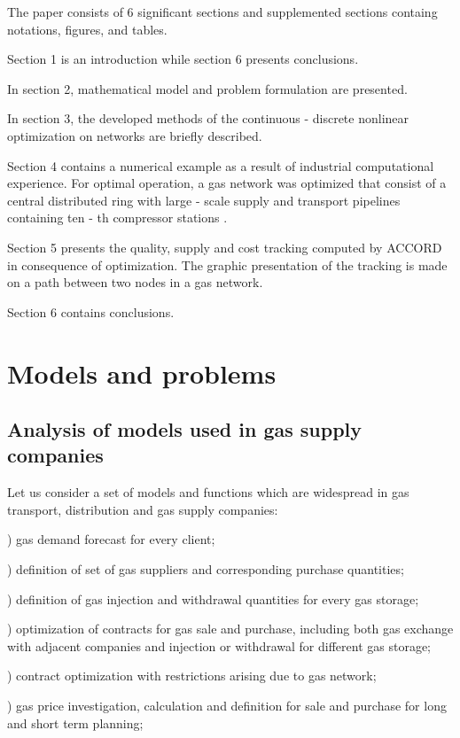 \documentclass{article}
\begin{document}
\bigskip

The paper consists of 6 significant sections and supplemented sections
containg notations, figures, and tables.

Section 1 is an introduction while section 6 presents conclusions.

In section 2, mathematical model and problem formulation are presented.

In section 3, the developed methods of the continuous - discrete nonlinear
optimization on networks are briefly described.

Section 4 contains a numerical example as a result of industrial
computational experience. For optimal operation, a gas network was optimized
that consist of a central distributed ring with large - scale supply and
transport pipelines containing ten - th compressor stations .

Section 5 presents the quality, supply and cost tracking computed by ACCORD
in consequence of optimization. The graphic presentation of the tracking is
made on a path between two nodes in a gas network.

Section 6 contains conclusions.

\section{Models and problems}

\subsection{Analysis of models used in gas supply companies}

Let us consider a set of models and functions which are widespread in gas
transport, distribution and gas supply companies:

) gas demand forecast for every client;

) definition of set of gas suppliers and corresponding purchase
quantities;

) definition of gas injection and withdrawal quantities for every
gas storage;

) optimization of contracts for gas sale and purchase, including
both gas exchange with adjacent companies and injection or withdrawal for
different gas storage;

) contract optimization with restrictions arising due to gas network;

) gas price investigation, calculation and definition for sale and
purchase for long and short term planning;
\end{document}
